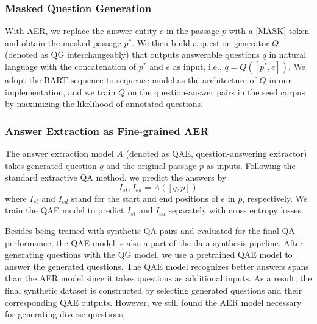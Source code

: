 \documentclass[11pt,a4paper]{article}
\begin{document}
\subsubsection{Masked Question Generation}
With AER, we replace the answer entity $e$ in the passage $p$ with a [MASK] token and obtain the masked passage $p^*$. We then build a question generator $Q$ (denoted as QG interchangeably) that outputs answerable questions $q$ in natural language with the concatenation of $p^*$ and $e$ as input, i.e., $q = Q([p^*, e])$.
We adopt the BART sequence-to-sequence model \cite{lewis2019bart} as the architecture of $Q$ in our implementation, and we train $Q$ on the question-answer pairs in the seed corpus by maximizing the likelihood of annotated questions.

\subsubsection{Answer Extraction as Fine-grained AER}
The answer extraction model $A$ (denoted as QAE, question-answering extractor) takes generated question $q$ and the original passage $p$ as inputs. Following the standard extractive QA method, we predict the answers by\begin{equation}
\label{eq:qa}
I_{st}, I_{ed} = A([q, p])
\end{equation}
where $I_{st}$ and $I_{ed}$ stand for the start and end positions of $e$ in $p$, respectively. We train the QAE model to predict $I_{st}$ and $I_{ed}$ separately with cross entropy losses.

Besides being trained with synthetic QA pairs and evaluated for the final QA performance, the QAE model is also a part of the data synthesis pipeline. After generating questions with the QG model, we use a pretrained QAE model to answer the generated questions. The QAE model recognizes better answers spans than the AER model since it takes questions as additional inputs. As a result, the final synthetic dataset is constructed by selecting generated questions and their corresponding QAE outputs. However, we still found the AER model necessary for generating diverse questions.
\end{document}
